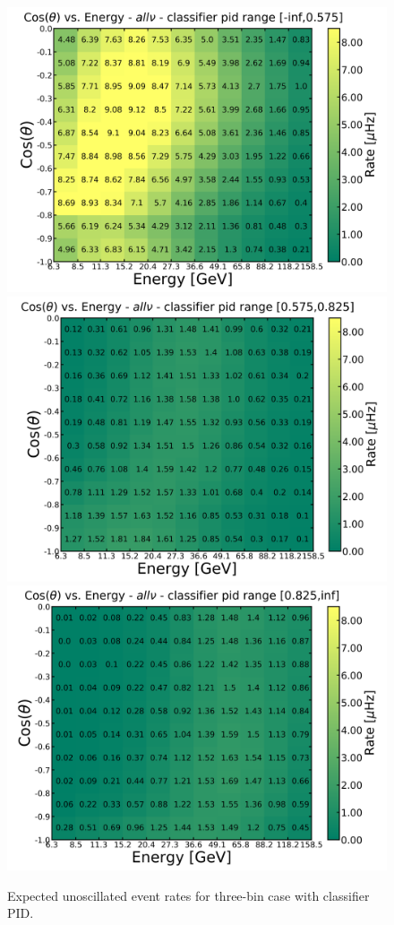 \begin{appendices}
\begin{figure}[h]
    \centering
    \includegraphics[width=0.49\linewidth]{figures/three_bin_cut_0575_0825_allnu_0_unoscillated_vmax.png}
    \includegraphics[width=0.49\linewidth]{figures/three_bin_cut_0575_0825_allnu_1_unoscillated_vmax.png}
    \includegraphics[width=0.49\linewidth]{figures/three_bin_cut_0575_0825_allnu_2_unoscillated_vmax.png}
    \caption[Expected unoscillated event rates for three-bin case with classifier PID]{Expected unoscillated event rates for three-bin case with classifier PID.}
    \label{fig:unoscillated_histrograms_classifier_3bin}
\end{figure}


\end{appendices}
